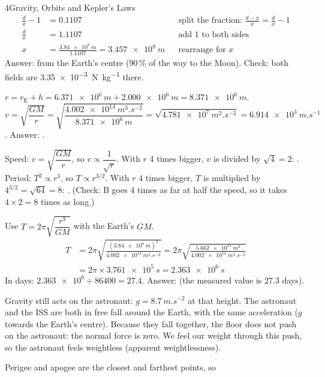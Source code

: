 \begin{chapteranswers}{4}{Gravity, Orbits and Kepler's Laws}
\begin{align*}
          \frac{d}{x} - 1 &= 0.1107 && \text{split the fraction: $\frac{d-x}{x} = \frac{d}{x} - 1$}\\
          \frac{d}{x} &= 1.1107 && \text{add 1 to both sides}\\
          x &= \frac{\qty{3.84e8}{m}}{1.1107} = \qty{3.457e8}{m} && \text{rearrange for $x$}
        \end{align*}
        Answer:  from the Earth's centre (90\,\% of the way to the
        Moon). Check: both fields are \qty{3.35e-3}{N.kg^{-1}} there.
  \item $r = r_\mathrm{E} + h = \qty{6.371e6}{m} + \qty{2.000e6}{m} = \qty{8.371e6}{m}$.
        $v = \sqrt{\dfrac{GM}{r}} = \sqrt{\dfrac{\qty{4.002e14}{m^3.s^{-2}}}{\qty{8.371e6}{m}}}
        = \sqrt{\qty{4.781e7}{m^2.s^{-2}}} = \qty{6.914e3}{m.s^{-1}}$.
        Answer: .
  \item Speed: $v = \sqrt{\dfrac{GM}{r}}$, so $v \propto \dfrac{1}{\sqrt r}$. With $r$ 4 times
        bigger, $v$ is divided by $\sqrt 4 = 2$: .
        Period: $T^2 \propto r^3$, so $T \propto r^{3/2}$. With $r$ 4 times bigger, $T$ is
        multiplied by $4^{3/2} = \sqrt{64} = 8$: .
        (Check: B goes 4 times as far at half the speed, so it takes $4 \times 2 = 8$ times as long.)
  \item Use $T = 2\pi\sqrt{\dfrac{r^3}{GM}}$ with the Earth's $GM$.
        \begin{align*}
          T &= 2\pi\sqrt{\frac{(\qty{3.84e8}{m})^3}{\qty{4.002e14}{m^3.s^{-2}}}}
            = 2\pi\sqrt{\frac{\qty{5.662e25}{m^3}}{\qty{4.002e14}{m^3.s^{-2}}}}\\
          &= 2\pi \times \qty{3.761e5}{s} = \qty{2.363e6}{s}
        \end{align*}
        In days: $\num{2.363e6} \div \num{86400} = 27.4$. Answer: 
        (the measured value is 27.3 days).
  \item Gravity still acts on the astronaut: $g = \qty{8.7}{m.s^{-2}}$ at that height. The
        astronaut and the ISS are both in free fall around the Earth, with the same acceleration
        ($g$ towards the Earth's centre). Because they fall together, the floor does not push on
        the astronaut: the normal force is zero. We feel our weight through this push, so the
        astronaut feels weightless (apparent weightlessness).
  \item Perigee and apogee are the closest and farthest points, so

\end{chapteranswers}
